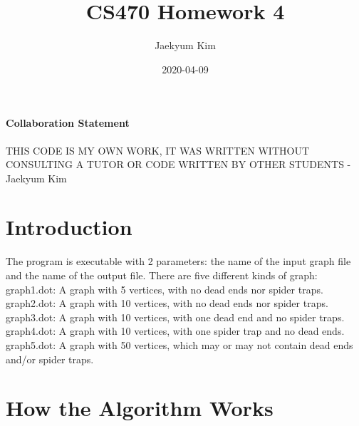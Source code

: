 \documentclass{article}
\title{CS470 Homework 4}
\date{2020-04-09}
\author{Jaekyum Kim}
\begin{document}
  \maketitle
  \newpage
\paragraph{Collaboration Statement}
THIS CODE IS MY OWN WORK, IT WAS WRITTEN WITHOUT CONSULTING A TUTOR OR CODE WRITTEN BY OTHER STUDENTS - Jaekyum Kim

\section{Introduction}
The program is executable with 2 parameters: the name of the input graph file and the name of the output file. There are five different kinds of graph: 
graph1.dot: A graph with 5 vertices, with no dead ends nor spider traps.
graph2.dot: A graph with 10 vertices, with no dead ends nor spider traps.
graph3.dot: A graph with 10 vertices, with one dead end and no spider traps.
graph4.dot: A graph with 10 vertices, with one spider trap and no dead ends.
graph5.dot: A graph with 50 vertices, which may or may not contain dead ends and/or spider traps.
\section{How the Algorithm Works}
\end{document}
